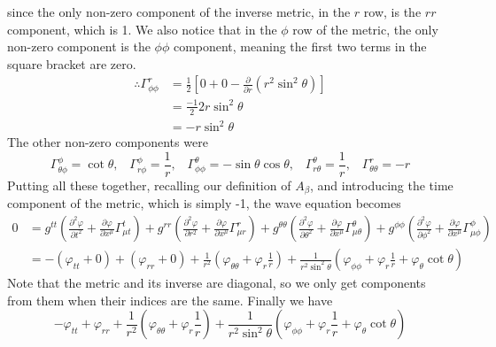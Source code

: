 \documentclass[11pt]{article}
\numberwithin{equation}{section}
\numberwithin{figure}{section}
\numberwithin{table}{section}
\begin{document}
since the only non-zero component of the inverse metric, in the $r$ row, is the $rr$ component, which is 1. We also notice that in the $\phi$ row of the metric, the only non-zero component is the $\phi\phi$ component, meaning the first two terms in the square bracket are zero.
\begin{align*}
    \therefore\Gamma^r_{\phi\phi}&=\frac{1}{2}[0+0-\frac{\partial}{\partial r}(r^2\sin^2\theta)]\\
    &=\frac{-1}{2}2r\sin^2\theta\\
    &=-r\sin^2\theta
\end{align*}
The other non-zero components were 
\begin{equation*}
    \Gamma^\phi_{\theta\phi}=\cot\theta,\;\;\;\Gamma^\phi_{r\phi}=\frac{1}{r},\;\;\;\Gamma^\theta_{\phi\phi}=-\sin\theta\cos\theta,\;\;\;\Gamma^\theta_{r\theta}=\frac{1}{r},\;\;\;\Gamma^r_{\theta\theta}=-r
\end{equation*}
Putting all these together, recalling our definition of $A_\beta$, and introducing the time component of the metric, which is simply -1, the wave equation becomes
\begin{align*}
    0&=g^{tt}\left(\frac{\partial^2\varphi}{\partial t^2}+\frac{\partial\varphi}{\partial x^\mu}\Gamma^t_{\mu t}\right)+g^{rr}\left(\frac{\partial^2\varphi}{\partial r^2}+\frac{\partial\varphi}{\partial x^\mu}\Gamma^r_{\mu r}\right)+g^{\theta\theta}\left(\frac{\partial^2\varphi}{\partial \theta^2}+\frac{\partial\varphi}{\partial x^\mu}\Gamma^\theta_{\mu \theta}\right)+g^{\phi\phi}\left(\frac{\partial^2\varphi}{\partial \phi^2}+\frac{\partial\varphi}{\partial x^\mu}\Gamma^\phi_{\mu \phi}\right)\\
    &=-(\varphi_{tt}+0)+(\varphi_{rr}+0)+\frac{1}{r^2}\left(\varphi_{\theta\theta}+\varphi_r\frac{1}{r}\right)+\frac{1}{r^2\sin^2\theta}\left(\varphi_{\phi\phi}+\varphi_r\frac{1}{r}+\varphi_\theta\cot\theta\right)
\end{align*}
Note that the metric and its inverse are diagonal, so we only get components from them when their indices are the same. Finally we have 
\begin{equation}
    -\varphi_{tt}+\varphi_{rr}+\frac{1}{r^2}\left(\varphi_{\theta\theta}+\varphi_r\frac{1}{r}\right)+\frac{1}{r^2\sin^2\theta}\left(\varphi_{\phi\phi}+\varphi_r\frac{1}{r}+\varphi_\theta\cot\theta\right)
    \label{eqn:wave equation spherical polars}
\end{equation}
\end{document}
